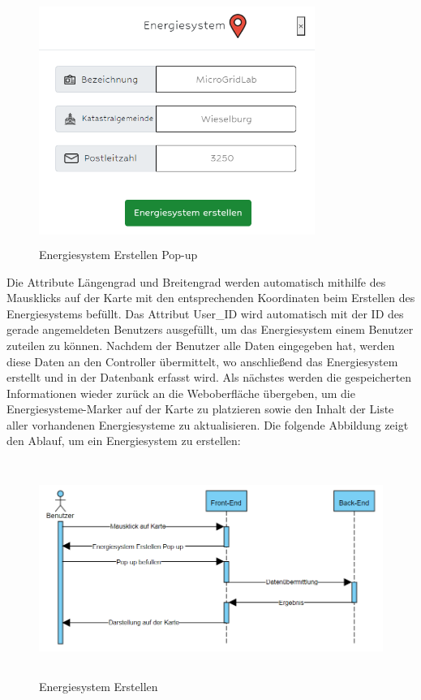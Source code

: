 \begin{figure}[h]
	\centering
	\includegraphics[height=8cm,width=9cm]{images/ESerstellenPop}
	\caption{Energiesystem Erstellen Pop-up}
	\label{fig:CSS_System}
\end{figure}
\newpage
Die Attribute Längengrad und Breitengrad werden automatisch mithilfe des Mausklicks auf der Karte mit den entsprechenden Koordinaten beim Erstellen des Energiesystems befüllt. Das Attribut User\_ID wird automatisch mit der ID des gerade angemeldeten Benutzers ausgefüllt, um das Energiesystem einem Benutzer zuteilen zu können.
Nachdem der Benutzer alle Daten eingegeben hat, werden diese Daten an den Controller übermittelt, wo anschließend das Energiesystem erstellt und in der Datenbank erfasst wird. Als nächstes werden die gespeicherten Informationen wieder zurück an die Weboberfläche übergeben, um die Energiesysteme-Marker auf der Karte zu platzieren sowie den Inhalt der Liste aller vorhandenen Energiesysteme zu aktualisieren. Die folgende Abbildung zeigt den Ablauf, um ein Energiesystem zu erstellen:

\begin{figure}[h]
	\centering
	\includegraphics[height=7cm,width=14cm]{images/ESerstellen}
	\caption{Energiesystem Erstellen}
	\label{fig:CSS_System}
\end{figure}





